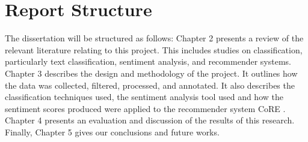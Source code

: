 \section{Report Structure}
The dissertation will be structured as follows: 
Chapter 2 presents a review of the relevant literature relating to this project. This includes studies on classification, particularly text classification, sentiment analysis, and recommender systems. Chapter 3 describes the design and methodology of the project. It outlines how the data was collected, filtered, processed, and annotated. It also describes the classification techniques used, the sentiment analysis tool used and how the sentiment scores produced were applied to the recommender system CoRE \cite{core2019}. Chapter 4 presents an evaluation and discussion of the results of this research. Finally, Chapter 5 gives our conclusions and future works.